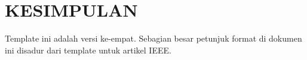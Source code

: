 
\section{\MakeUppercase{Kesimpulan}}
Template ini adalah versi ke-empat. Sebagian besar petunjuk format di dokumen ini disadur dari template untuk artikel IEEE.

